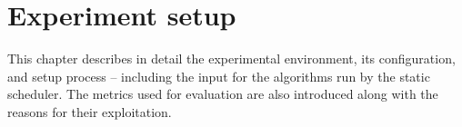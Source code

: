 \thispagestyle{only-cfoot}
\section{Experiment setup}\label{s:ExperimentSetup}





This chapter describes in detail the experimental environment, its configuration, and setup process -- including the input for the algorithms run by the static scheduler.
The metrics used for evaluation are also introduced along with the reasons for their exploitation.





